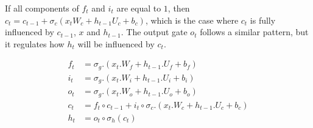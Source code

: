If all components of $f_t$ and $i_t$ are equal to $1$, then $c_t = c_{t-1} + \sigma_c(x_t W_{c} + h_{t-1} U_{c} + b_c)$, which is the case where $c_t$ is fully influenced by $c_{t-1}$, $x$ and $h_{t-1}$. The output gate $o_t$ follows a similar pattern, but it regulates how $h_t$ will be influenced by $c_t$.

\begin{align}
\label{eq:lstmequationsstart}     
f_t &= \sigma_g.(x_t.W_{f} + h_{t-1}.U_{f} + b_f) \\
i_t &= \sigma_g.(x_t.W_{i} + h_{t-1}.U_{i} + b_i) \\
o_t &= \sigma_g.(x_t.W_{o} + h_{t-1}.U_{o} + b_o) \\
c_t &= f_t \circ c_{t-1} + i_t \circ \sigma_c.(x_t.W_{c} + h_{t-1}.U_{c} + b_c) \\
\label{eq:lstmequationsend}
h_t &= o_t \circ \sigma_h(c_t)
    \end{align}

